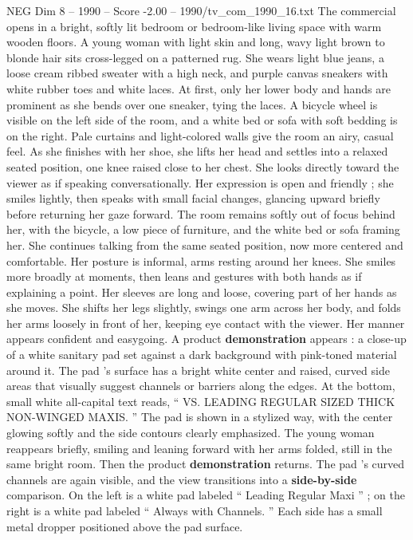 \begin{textsample}{NEG Dim 8 – 1990 – Score -2.00 – 1990/tv\_com\_1990\_16.txt}  \label{ex:f8_neg_037}
The commercial opens in a bright, softly lit bedroom or bedroom-like living space with warm wooden floors.
A young woman with light skin and long, wavy light brown to blonde hair sits cross-legged on a patterned rug.
She wears light blue jeans, a loose cream ribbed sweater with a high neck, and purple canvas sneakers with white rubber toes and white laces.
At first, only her lower body and hands are prominent as she bends over one sneaker, tying the laces.
A bicycle wheel is visible on the left side of the room, and a white bed or sofa with soft bedding is on the right.
Pale curtains and light-colored walls give the room an airy, casual feel.
As she finishes with her shoe, she lifts her head and settles into a relaxed seated position, one knee raised close to her chest.
She looks directly toward the viewer as if speaking conversationally.
Her expression is open and friendly ; she smiles lightly, then speaks with small facial changes, glancing upward briefly before returning her gaze forward.
The room remains softly out of focus behind her, with the bicycle, a low piece of furniture, and the white bed or sofa framing her.
She continues talking from the same seated position, now more centered and comfortable.
Her posture is informal, arms resting around her knees.
She smiles more broadly at moments, then leans and gestures with both hands as if explaining a point.
Her sleeves are long and loose, covering part of her hands as she moves.
She shifts her legs slightly, swings one arm across her body, and folds her arms loosely in front of her, keeping eye contact with the viewer.
Her manner appears confident and easygoing.
A product \textbf{demonstration} appears : a close-up of a white sanitary pad set against a dark background with pink-toned material around it.
The pad ’s surface has a bright white center and raised, curved side areas that visually suggest channels or barriers along the edges.
At the bottom, small white all-capital text reads, “ VS.
LEADING REGULAR SIZED THICK NON-WINGED MAXIS. ” The pad is shown in a stylized way, with the center glowing softly and the side contours clearly emphasized.
The young woman reappears briefly, smiling and leaning forward with her arms folded, still in the same bright room.
Then the product \textbf{demonstration} returns.
The pad ’s curved channels are again visible, and the view transitions into a \textbf{side-by-side} comparison.
On the left is a white pad labeled “ Leading Regular Maxi ” ; on the right is a white pad labeled “ Always with Channels. ” Each side has a small metal dropper positioned above the pad surface.

\end{textsample}
